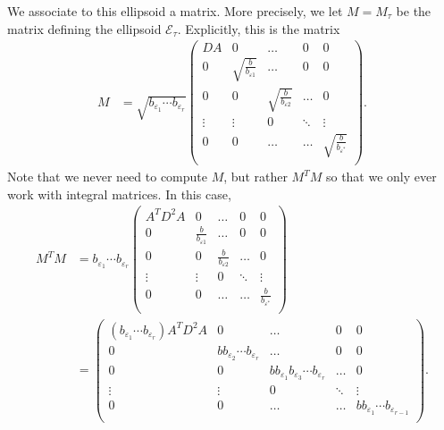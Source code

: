 We associate to this ellipsoid a matrix. More precisely, we let $M=M_\tau$ be the matrix defining the ellipsoid $\mathcal{E}_{\tau}$. Explicitly, this is the matrix
\begin{align*}
M &=\sqrt{b_{\varepsilon_1}\cdots b_{\varepsilon_r}}\begin{pmatrix}
	DA & 0 & \dots & 0 & 0\\
	0 & \sqrt{\frac{b}{b_{\varepsilon 1}}} & \dots & 0 & 0\\
	0 & 0  & \sqrt{\frac{b}{b_{\varepsilon 2}}} & \dots & 0\\
	\vdots & \vdots &0 &  \ddots & \vdots\\ 
	0 & 0 & \dots & \dots & \sqrt{\frac{b}{b_{\varepsilon^*}}} \\
	\end{pmatrix}.
\end{align*}	
Note that we never need to compute $M$, but rather $M^TM$ so that we only ever work with integral matrices. In this case, 
\begin{align*}
M^TM &= b_{\varepsilon_1}\cdots b_{\varepsilon_r}\begin{pmatrix}
	A^TD^2A & 0 & \dots & 0 & 0\\
	0 & \frac{b}{b_{\varepsilon 1}} & \dots & 0 & 0\\
	0 & 0  & \frac{b}{b_{\varepsilon 2}} & \dots & 0\\
	\vdots & \vdots &0 &  \ddots & \vdots\\ 
	0 & 0 & \dots & \dots & \frac{b}{b_{\varepsilon^*}} \\
	\end{pmatrix}\\
	& = \begin{pmatrix}
	(b_{\varepsilon_1}\cdots b_{\varepsilon_r})A^TD^2A & 0 & \dots & 0 & 0\\
	0 & b b_{\varepsilon_2}\cdots b_{\varepsilon_r} & \dots & 0 & 0\\
	0 & 0  & bb_{\varepsilon_1}b_{\varepsilon_3}\cdots b_{\varepsilon_r} & \dots & 0\\
	\vdots & \vdots &0 &  \ddots & \vdots\\ 
	0 & 0 & \dots & \dots & bb_{\varepsilon_1}\cdots b_{\varepsilon_{r-1}} \\
	\end{pmatrix}.
\end{align*}	




